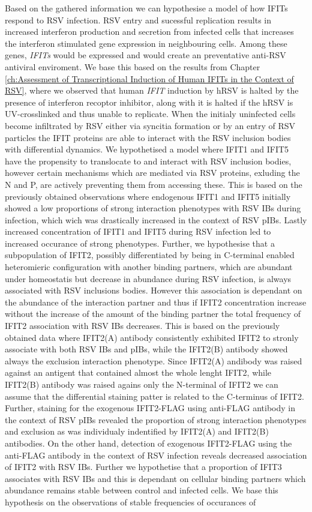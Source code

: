 Based on the gathered information we can hypothesise a model of how IFITs respond to RSV infection. RSV entry and sucessful replication results in increased interferon production and secretion from infected cells that increases the interferon stimulated gene expression in neighbouring cells. Among these genes, \textit{IFITs} would be expressed and would create an preventative anti-RSV antiviral enviroment. We base this based on the results from Chapter \ref{ch:Assessment of Transcriptional Induction of Human IFITs in the Context of RSV}, where we observed that human \textit{IFIT} induction by hRSV is halted by the presence of interferon recoptor inhibitor, along with it is halted if the hRSV is UV-crosslinked and thus unable to replicate. When the initialy uninfected cells become infiltrated by RSV either via syncitia formation or by an entry of RSV particles the IFIT proteins are able to interact with the RSV inclusion bodies with differential dynamics. We hypothetised a model where IFIT1 and IFIT5 have the propensity to translocate to and interact with RSV inclusion bodies, however certain mechanisms which are mediated via RSV proteins, exluding the N and P, are actively preventing them from accessing these. This is based on the previously obtained observations where endogenous IFIT1 and IFIT5 initially showed a low proportions of strong interaction phenotypes with RSV IBs during infection, which wich was drastically increased in the context of RSV pIBs. Lastly increased concentration of IFIT1 and IFIT5 during RSV infection led to increased occurance of strong phenotypes. Further, we hypothesise that a subpopulation of IFIT2, possibly differentiated by being in C-terminal enabled heteromieric configuration with another binding partners, which are abundant under homeostatis but decrease in abundance during RSV infection, is always associated with RSV inclusions bodies. However this association is dependant on the abundance of the interaction partner and thus if IFIT2 concentration increase without the increase of the amount of the binding partner the total frequency of IFIT2 association with RSV IBs decreases. This is based on the previously obtained data where IFIT2(A) antibody consistently exhibited IFIT2 to stronly associate with both RSV IBs and pIBs, while the IFIT2(B) antibody showed always the exclusion interaction phenotype. Since IFIT2(A) andibody was raised against an antigent that contained almost the whole lenght IFIT2, while IFIT2(B) antibody was raised agains only the N-terminal of IFIT2 we can assume that the differential staining patter is related to the C-terminus of IFIT2. Further, staining for the exogenous IFIT2-FLAG using anti-FLAG antibody in the context of RSV pIBs revealed the proportion of strong interaction phenotypes and exclusion as was individualy indentified by IFIT2(A) and IFIT2(B) antibodies. On the other hand, detection of exogenous IFIT2-FLAG using the anti-FLAG antibody in the context of RSV infection reveals decreased association of IFIT2 with RSV IBs. Further we hypothetise that a proportion of IFIT3 associates with RSV IBs and this is dependant on cellular binding partners which abundance remains stable between control and infected cells. We base this hypothesis on the observations of stable frequencies of occurances of 